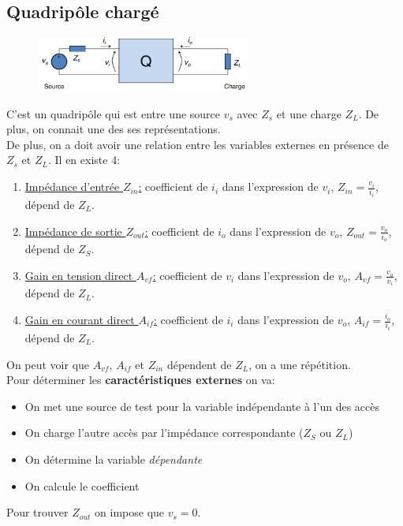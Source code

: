 \documentclass{report}
\begin{document}
\subsection{Quadripôle chargé}
\begin{figure}[H]
\centering
\includegraphics[width=7cm]{img/quadriCharge.png}
\end{figure}
C'est un quadripôle qui est entre une source $v_s$ avec $Z_s$ et une charge $Z_L$. De plus, on connait une des ses représentations.\\
De plus, on a doit avoir une relation entre les variables externes en présence de $Z_s$ et $Z_L$. Il en existe 4:
\begin{enumerate}
\item \underline{Impédance d'entrée $Z_{in}$:} coefficient de $i_i$ dans l'expression de $v_i$, $Z_{in} = \frac{v_i}{i_i}$, dépend de $Z_L$.
\item \underline{Impédance de sortie $Z_{out}$:} coefficient de $i_o$ dans l'expression de $v_o$, $Z_{out} = \frac{v_o}{i_o}$, dépend de $Z_S$.
\item \underline{Gain en tension direct $A_{vf}$:} coefficient de $v_i$ dans l'expression de $v_o$, $A_{vf} = \frac{v_o}{v_i}$, dépend de $Z_L$.
\item \underline{Gain en courant direct $A_{if}$:} coefficient de $i_i$ dans l'expression de $v_o$, $A_{if} = \frac{i_o}{i_i}$, dépend de $Z_L$.
\end{enumerate}

On peut voir que $A_{vf}$, $A_{if}$ et $Z_{in}$ dépendent de $Z_L$, on a une répétition.\\
Pour déterminer les \textbf{caractéristiques externes} on va:
\begin{itemize}
\item On met une source de test pour la variable indépendante à l'un des accès
\item On charge l'autre accès par l'impédance correspondante ($Z_S$ ou $Z_L$)
\item On détermine la variable \textit{dépendante}
\item On calcule le coefficient
\end{itemize}
Pour trouver $Z_{out}$ on impose que $v_s = 0$.
\end{document}
